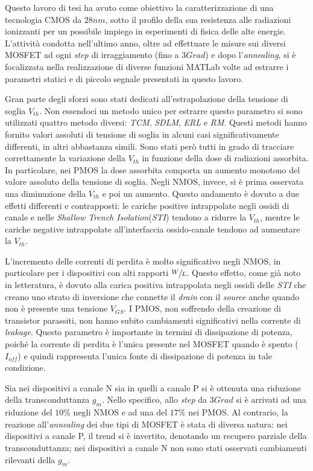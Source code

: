 Questo lavoro di tesi ha avuto come obiettivo la caratterizzazione di una tecnologia CMOS da $28nm$, sotto il profilo della sua resistenza alle radiazioni ionizzanti per un possibile impiego in esperimenti di fisica delle alte energie. L'attività condotta nell'ultimo anno, oltre ad effettuare le misure sui diversi MOSFET ad ogni \emph{step} di irraggiamento (fino a $3Grad$) e dopo l'\textit{annealing}, si è focalizzata nella realizzazione di diverse funzioni MATLab volte ad estrarre i parametri statici e di piccolo segnale presentati in questo lavoro.

\vspace{0.5cm}

Gran parte degli sforzi sono stati dedicati all'estrapolazione della tensione di soglia $V_{th}$. Non essendoci un metodo unico per estrarre questo parametro si sono utilizzati quattro metodo diversi: \textit{TCM}, \textit{SDLM}, \textit{ERL} e \textit{RM}. Questi metodi hanno fornito valori assoluti di tensione di soglia in alcuni casi significativamente differenti, in altri abbastanza simili. Sono stati però tutti in grado di tracciare correttamente la variazione della $V_{th}$ in funzione della dose di radiazioni assorbita. In particolare, nei PMOS la dose assorbita comporta un aumento monotono del valore assoluto della tensione di soglia. Negli NMOS, invece, si è prima osservata una diminuzione della $V_{th}$ e poi un aumento. Questo andamento è dovuto a due effetti differenti e contrapposti: le cariche positive intrappolate negli ossidi di canale e nelle \emph{Shallow Trench Isolation}(\emph{STI}) tendono a ridurre la $V_{th}$, mentre le cariche negative intrappolate all'interfaccia ossido-canale tendono ad aumentare la $V_{th}$.

L'incremento delle correnti di perdita è molto significativo negli NMOS, in particolare per i dispositivi con alti rapporti $\sfrac{W}{L}$. Questo effetto, come già noto in letteratura, è dovuto alla carica positiva intrappolata negli ossidi delle \emph{STI} che creano uno strato di inversione che connette il \emph{drain} con il \emph{source} anche quando non è presente una tensione $V_{GS}$. I PMOS, non soffrendo della creazione di transistor parassiti, non hanno subito cambiamenti significativi nella corrente di \emph{leakage}. Questo parametro è importante in termini di dissipazione di potenza, poiché la corrente di perdita è l'unica presente nel MOSFET quando è spento ($I_{off}$) e quindi rappresenta l'unica fonte di dissipazione di potenza in tale condizione.   

Sia nei dispositivi a canale N sia in quelli a canale P si è ottenuta una riduzione della transconduttanza $g_m$. Nello specifico, allo \emph{step} da $3Grad$ si è arrivati ad una riduzione del $10\%$ negli NMOS e ad una del $17\%$ nei PMOS. Al contrario, la reazione all'\textit{annealing} dei due tipi di MOSFET è stata di diversa natura: nei dispositivi a canale P, il trend si è invertito, denotando un recupero parziale della transconduttanza; nei dispositivi a canale N non sono stati osservati cambiamenti rilevanti della $g_m$.    

   